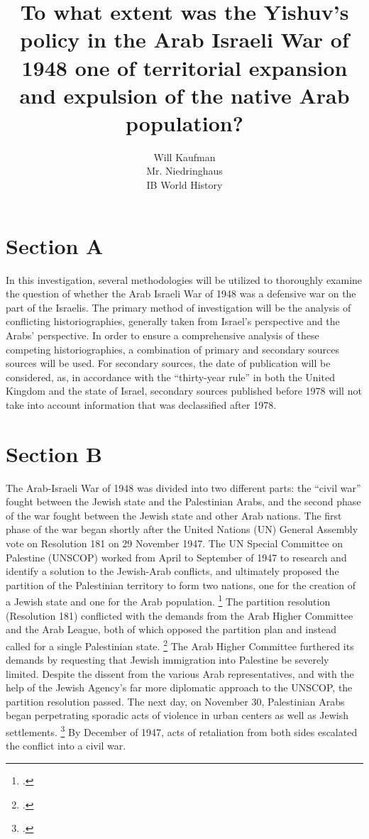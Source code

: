 \documentclass{turabian-researchpaper}
\begin{document}
\title{To what extent was the Yishuv's policy in the Arab Israeli War of 1948 one of territorial expansion and expulsion of the native Arab population?}

\author{Will Kaufman \\ Mr. Niedringhaus \\ IB World History}
\maketitle

\section{Section A}
In this investigation, several methodologies will be utilized to thoroughly examine the question of whether the Arab Israeli War of 1948 was a defensive war on the part of the Israelis.  The primary method of investigation will be the analysis of conflicting historiographies, generally taken from Israel's perspective and the Arabs' perspective.  In order to ensure a comprehensive analysis of these competing historiographies, a combination of primary and secondary sources sources will be used.  For secondary sources, the date of publication will be considered, as, in accordance with the “thirty-year rule” in both the United Kingdom and the state of Israel, secondary sources published before 1978 will not take into account information that was declassified after 1978.

\section{Section B}
The Arab-Israeli War of 1948 was divided into two different parts: the “civil war” fought between the Jewish state and the Palestinian Arabs, and the second phase of the war fought between the Jewish state and other Arab nations.  The first phase of the war began shortly after the United Nations (UN) General Assembly vote on Resolution 181 on 29 November 1947.  The UN Special Committee on Palestine (UNSCOP) worked from April to September of 1947 to research and identify a solution to the Jewish-Arab conflicts, and ultimately proposed the partition of the Palestinian territory to form two nations, one for the creation of a Jewish state and one for the Arab population.
\footcite[22]{pappe}
The partition resolution (Resolution 181) conflicted with the demands from the Arab Higher Committee and the Arab League, both of which opposed the partition plan and instead called for a single Palestinian state.
\footcite[][23]{pappe}
The Arab Higher Committee furthered its demands by requesting that Jewish immigration into Palestine be severely limited.  Despite the dissent from the various Arab representatives, and with the help of the Jewish Agency's far more diplomatic approach to the UNSCOP, the partition resolution passed.  The next day, on November 30, Palestinian Arabs began perpetrating sporadic acts of violence in urban centers as well as Jewish settlements.
\footcite[][77]{morris}
By December of 1947, acts of retaliation from both sides escalated the conflict into a civil war.
\end{document}
